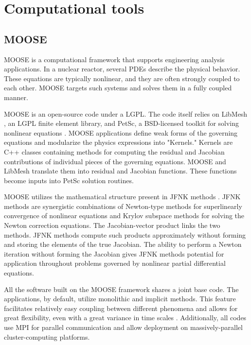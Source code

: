 
\section{Computational tools}

\subsection{MOOSE}

\gls{MOOSE}\cite{gaston_moose_2009} is a computational framework that supports engineering analysis applications.
In a nuclear reactor, several \glspl{PDE} describe the physical behavior.
These equations are typically nonlinear, and they are often strongly coupled to each other.
\gls{MOOSE} targets such systems and solves them in a fully coupled manner.

\gls{MOOSE} is an open-source code under a \gls{LGPL}.
The code itself relies on LibMesh \cite{kirk_libmesh_2006}, an LGPL finite element library, and PetSc, a \gls{BSD}-licensed toolkit for solving nonlinear equations \cite{balay_petsc_2016}.
MOOSE applications define weak forms of the governing equations and 
modularize the physics expressions into "Kernels."
Kernels are C++ classes containing methods for computing the residual and Jacobian contributions of individual pieces of the governing equations.
\gls{MOOSE} and LibMesh translate them into residual and Jacobian functions.
These functions become inputs into PetSc solution routines.

\gls{MOOSE} utilizes the mathematical structure present in \gls{JFNK} methods \cite{knoll_jacobian-free_2004}.
\gls{JFNK} methods are synergistic combinations of Newton-type methods for superlinearly convergence of nonlinear equations and Krylov subspace methods for solving the Newton correction equations.
The Jacobian-vector product links the two methods.
JFNK methods compute such products approximately without forming and storing the elements of the true Jacobian.
The ability to perform a Newton iteration without forming the Jacobian gives JFNK methods potential for application throughout problems governed by nonlinear partial differential equations.

All the software built on the MOOSE framework shares a joint base code.
The applications, by default, utilize monolithic and implicit methods.
This feature facilitates relatively easy coupling between different phenomena and allows for great flexibility, even with a great variance in time scales \cite{novak_pronghorn_2018}.
Additionally, all codes use \gls{MPI} for parallel communication and allow deployment on massively-parallel cluster-computing platforms.

